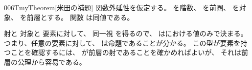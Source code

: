 \documentclass[index]{subfiles}
\begin{document}
\begin{myBlock}{006T}{myTheorem}[米田の補題]
  関数外延性を仮定する。
  を階数、
  を前圏、
  を対象、
  を前層とする。
  関数
  は同値である。
\end{myBlock}
\StartDefiningTabulars
\begin{myProof}
  射と
  対象と
  要素に対して、
  同一視
  を得るので、
  はにおける値のみで決まる。
  つまり、任意の要素に対して、
  は命題であることが分かる。
  この型が要素を持つことを確認するには、
  が前層の射であることを確かめればよいが、
  それは前層の公理から容易である。
\end{myProof}
\StopDefiningTabulars
\end{document}
